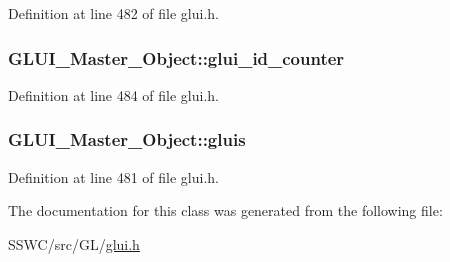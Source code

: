 Definition at line 482 of file glui.\+h.

\hypertarget{class_g_l_u_i___master___object_a9cd3c12203f03cd54115e7852e0d82e3}{
\subsubsection[{glui\+\_\+id\+\_\+counter}]{ G\+L\+U\+I\+\_\+\+Master\+\_\+\+Object\+::glui\+\_\+id\+\_\+counter}}\label{class_g_l_u_i___master___object_a9cd3c12203f03cd54115e7852e0d82e3}


Definition at line 484 of file glui.\+h.

\hypertarget{class_g_l_u_i___master___object_adef972538b4195478dd9feaabd55bd26}{
\subsubsection[{gluis}]{ G\+L\+U\+I\+\_\+\+Master\+\_\+\+Object\+::gluis}}\label{class_g_l_u_i___master___object_adef972538b4195478dd9feaabd55bd26}


Definition at line 481 of file glui.\+h.



The documentation for this class was generated from the following file\+:\begin{DoxyCompactItemize}
\item 
S\+S\+W\+C/src/\+G\+L/\hyperlink{glui_8h}{glui.\+h}\end{DoxyCompactItemize}
